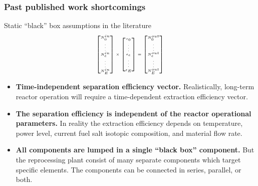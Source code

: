 \begin{frame}
\frametitle{Past published work shortcomings}
\vspace{-0.2in}
\begin{block}{Static ``black'' box assumptions in the literature}
	\begin{equation*}
	{\tiny  
		\setlength{\abovedisplayskip}{6pt}
		\setlength{\belowdisplayskip}{\abovedisplayskip}
		\setlength{\abovedisplayshortskip}{0pt}
		\setlength{\belowdisplayshortskip}{3pt}
	\begin{aligned}
	\begin{bmatrix}
	N^{in}_{0} \\ \vdots \\ N^{in}_{e} \\ \vdots \\ N^{in}_{E} \\
	\end{bmatrix} 
	\times
	\begin{bmatrix}
	\epsilon_{0} \\ \vdots \\ \epsilon_{e} \\ \vdots \\ \epsilon_{E} \\
	\end{bmatrix} =
	\begin{bmatrix}
	N^{out}_{0}\\ \vdots \\ N^{out}_{e} \\ \vdots \\N^{out}_{E}  \\
	\end{bmatrix}
	\end{aligned}
	}
	\end{equation*}
	\begin{itemize}
		\item \textbf{Time-independent separation efficiency vector.} Realistically, 
		long-term reactor operation will require a time-dependent extraction efficiency vector.
		\item \textbf{The separation efficiency is independent of the reactor operational 
		parameters.} In reality the extraction efficiency depends on temperature, 
		power level, current fuel salt isotopic composition, and material flow rate.
		\item \textbf{All components are lumped in a single ``black 
		box'' component.} But the reprocessing plant consist of many separate 
		components which target specific elements. The components can be 
		connected in series, parallel, or both. 
	\end{itemize}
\end{block}
\end{frame}

